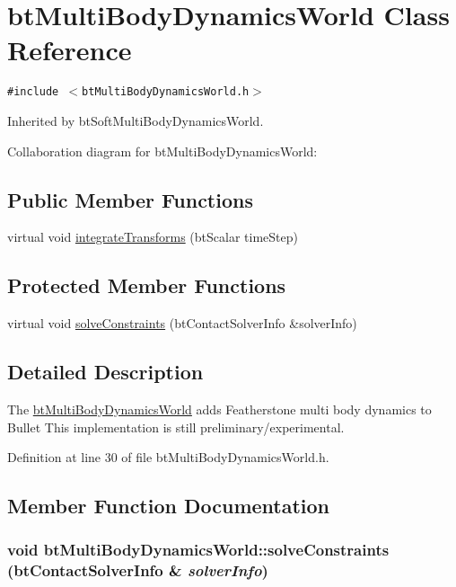 \hypertarget{classbt_multi_body_dynamics_world}{
\section{btMultiBodyDynamicsWorld Class Reference}
\label{classbt_multi_body_dynamics_world}
}
{\tt \#include $<$btMultiBodyDynamicsWorld.h$>$}

Inherited by btSoftMultiBodyDynamicsWorld.

Collaboration diagram for btMultiBodyDynamicsWorld:\subsection*{Public Member Functions}
\begin{CompactItemize}
\item 
virtual void \hyperlink{classbt_multi_body_dynamics_world_6abe9896c6178b8d5bebdbca53fa7a74}{integrateTransforms} (btScalar timeStep)
\end{CompactItemize}
\subsection*{Protected Member Functions}
\begin{CompactItemize}
\item 
virtual void \hyperlink{classbt_multi_body_dynamics_world_96ca0256c11525090a831cc854fe0750}{solveConstraints} (btContactSolverInfo \&solverInfo)
\end{CompactItemize}


\subsection{Detailed Description}
The \hyperlink{classbt_multi_body_dynamics_world}{btMultiBodyDynamicsWorld} adds Featherstone multi body dynamics to Bullet This implementation is still preliminary/experimental. 

Definition at line 30 of file btMultiBodyDynamicsWorld.h.

\subsection{Member Function Documentation}
\hypertarget{classbt_multi_body_dynamics_world_96ca0256c11525090a831cc854fe0750}{
\subsubsection[solveConstraints]{\setlength{\rightskip}{0pt plus 5cm}void btMultiBodyDynamicsWorld::solveConstraints (btContactSolverInfo \& {\em solverInfo})}}
\label{classbt_multi_body_dynamics_world_96ca0256c11525090a831cc854fe0750}





